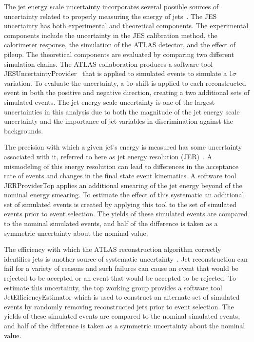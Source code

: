 The jet energy scale uncertainty incorporates several possible sources of uncertainty related to properly measuring the energy of jets~\cite{JES, JESnew, JETUNCERTAINTIES}. The JES uncertainty has both experimental and theoretical components. The experimental components include the uncertainty in the JES calibration method, the calorimeter response, the simulation of the ATLAS detector, and the effect of pileup. The theoretical components are evaluated by comparing two different simulation chains. The ATLAS collaboration produces a software tool {\sc JESUncertaintyProvider}~\cite{JESUNCERTAINTYSOFTWARE} that is applied to simulated events to simulate a 1$\sigma$ variation. To evaluate the uncertainty, a 1$\sigma$ shift is applied to each reconstructed event in both the positive and negative direction, creating a two additional sets of simulated events. The jet energy scale uncertainty is one of the largest uncertainties in this analysis due to both the magnitude of the jet energy scale uncertainty and the importance of jet variables in discrimination against the backgrounds. \\


{}

The precision with which a given jet's energy is measured has some uncertainty associated with it, referred to here as jet energy resolution (JER)~\cite{JETUNCERTAINTIES}. A mismodeling of this energy resolution can lead to differences in the acceptance rate of events and changes in the final state event kinematics. A software tool {\sc JERProviderTop} applies an additional smearing of the jet energy beyond of the nominal energy smearing.  To estimate the effect of this systematic an additional set of simulated events is created by applying this tool to the set of simulated events prior to event selection. The yields of these simulated events are compared to the nominal simulated events, and half of the difference is taken as a symmetric uncertainty about the nominal value. \\

{}

The efficiency with which the ATLAS reconstruction algorithm correctly identifies jets is another source of systematic uncertainty~\cite{JETUNCERTAINTIES, JRE}. Jet reconstruction can fail for a variety of reasons and such failures can cause an event that would be rejected to be accepted or an event that would be accepted to be rejected. To estimate this uncertainty, the top working group provides a software tool {\sc JetEfficiencyEstimator} which is used to construct an alternate set of simulated events by randomly removing reconstructed jets prior to event selection. The yields of these simulated events are compared to the nominal simulated events, and half of the difference is taken as a symmetric uncertainty about the nominal value. \\

